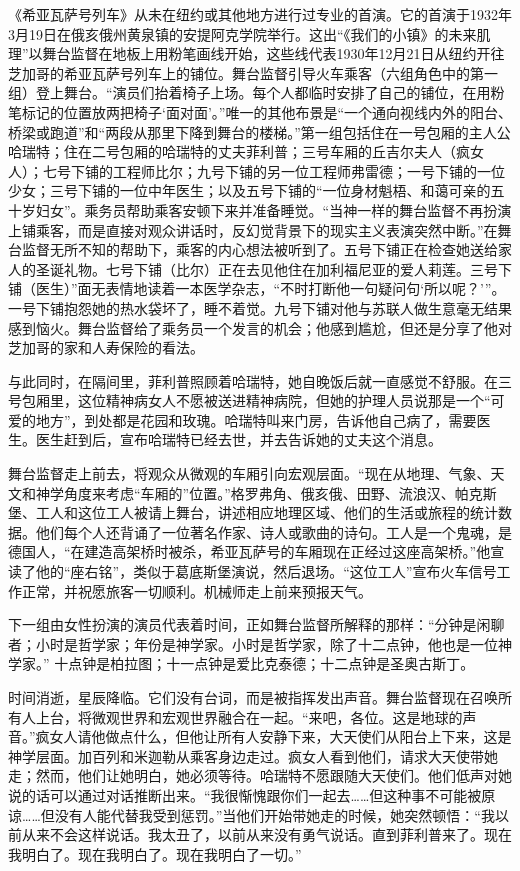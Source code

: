 \documentclass[lang=cn,newtx,10pt,scheme=chinese]{elegantbook}
\begin{document}
《希亚瓦萨号列车》从未在纽约或其他地方进行过专业的首演。它的首演于1932年3月19日在俄亥俄州黄泉镇的安提阿克学院举行。这出“《我们的小镇》的未来肌理”以舞台监督在地板上用粉笔画线开始，这些线代表1930年12月21日从纽约开往芝加哥的希亚瓦萨号列车上的铺位。舞台监督引导火车乘客（六组角色中的第一组）登上舞台。“演员们抬着椅子上场。每个人都临时安排了自己的铺位，在用粉笔标记的位置放两把椅子‘面对面’。”唯一的其他布景是“一个通向视线内外的阳台、桥梁或跑道”和“两段从那里下降到舞台的楼梯。”第一组包括住在一号包厢的主人公哈瑞特；住在二号包厢的哈瑞特的丈夫菲利普；三号车厢的丘吉尔夫人（疯女人）；七号下铺的工程师比尔；九号下铺的另一位工程师弗雷德；一号下铺的一位少女；三号下铺的一位中年医生；以及五号下铺的“一位身材魁梧、和蔼可亲的五十岁妇女”。乘务员帮助乘客安顿下来并准备睡觉。“当神一样的舞台监督不再扮演上铺乘客，而是直接对观众讲话时，反幻觉背景下的现实主义表演突然中断。”在舞台监督无所不知的帮助下，乘客的内心想法被听到了。五号下铺正在检查她送给家人的圣诞礼物。七号下铺（比尔）正在去见他住在加利福尼亚的爱人莉莲。三号下铺（医生）”面无表情地读着一本医学杂志，“不时打断他一句疑问句‘所以呢？’”。一号下铺抱怨她的热水袋坏了，睡不着觉。九号下铺对他与苏联人做生意毫无结果感到恼火。舞台监督给了乘务员一个发言的机会；他感到尴尬，但还是分享了他对芝加哥的家和人寿保险的看法。

与此同时，在隔间里，菲利普照顾着哈瑞特，她自晚饭后就一直感觉不舒服。在三号包厢里，这位精神病女人不愿被送进精神病院，但她的护理人员说那是一个“可爱的地方”，到处都是花园和玫瑰。哈瑞特叫来门房，告诉他自己病了，需要医生。医生赶到后，宣布哈瑞特已经去世，并去告诉她的丈夫这个消息。

舞台监督走上前去，将观众从微观的车厢引向宏观层面。“现在从地理、气象、天文和神学角度来考虑“车厢的”位置。”格罗弗角、俄亥俄、田野、流浪汉、帕克斯堡、工人和这位工人被请上舞台，讲述相应地理区域、他们的生活或旅程的统计数据。他们每个人还背诵了一位著名作家、诗人或歌曲的诗句。工人是一个鬼魂，是德国人，“在建造高架桥时被杀，希亚瓦萨号的车厢现在正经过这座高架桥。”他宣读了他的“座右铭”，类似于葛底斯堡演说，然后退场。“这位工人”宣布火车信号工作正常，并祝愿旅客一切顺利。机械师走上前来预报天气。

下一组由女性扮演的演员代表着时间，正如舞台监督所解释的那样：“分钟是闲聊者；小时是哲学家；年份是神学家。小时是哲学家，除了十二点钟，他也是一位神学家。” 十点钟是柏拉图；十一点钟是爱比克泰德；十二点钟是圣奥古斯丁。

时间消逝，星辰降临。它们没有台词，而是被指挥发出声音。舞台监督现在召唤所有人上台，将微观世界和宏观世界融合在一起。“来吧，各位。这是地球的声音。”疯女人请他做点什么，但他让所有人安静下来，大天使们从阳台上下来，这是神学层面。加百列和米迦勒从乘客身边走过。疯女人看到他们，请求大天使带她走；然而，他们让她明白，她必须等待。哈瑞特不愿跟随大天使们。他们低声对她说的话可以通过对话推断出来。“我很惭愧跟你们一起去……但这种事不可能被原谅……但没有人能代替我受到惩罚。”当他们开始带她走的时候，她突然顿悟：“我以前从来不会这样说话。我太丑了，以前从来没有勇气说话。直到菲利普来了。现在我明白了。现在我明白了。现在我明白了一切。”
\end{document}
